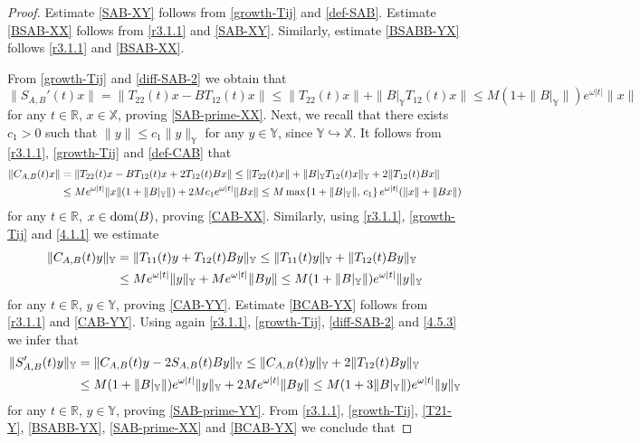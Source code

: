 \documentclass[11pt]{amsart}
\numberwithin{equation}{section}
\newcommand{\SAB}{S_{A,B}}
\newcommand{\CAB}{C_{A,B}}
\theoremstyle{remark}
\theoremstyle{definition}
\newcommand\bX{{\mathbb X}}
\newcommand\bY{{\mathbb Y}}
\newcommand{\dom}{\text{\rm{dom}}}
\begin{document}
\begin{proof}
Estimate \eqref{SAB-XY}	follows from \eqref{growth-Tij} and \eqref{def-SAB}. Estimate \eqref{BSAB-XX} follows from \eqref{r3.1.1} and \eqref{SAB-XY}. Similarly, estimate \eqref{BSABB-YX} follows \eqref{r3.1.1} and \eqref{BSAB-XX}.
	
From \eqref{growth-Tij} and \eqref{diff-SAB-2} we obtain that 
	\begin{equation}\label{4.5.1}
		\|S_{A,B}'(t)x\| = \|T_{22}(t)x - BT_{12}(t)x\| \leq \|T_{22}(t)x\| + \|B|_\bY T_{12}(t)x\|
		\leq M(1+\|B|_\bY\|)e^{\omega|t|}\|x\|
	\end{equation}
for any $t \in \mathbb{R}$, $x \in\bX$, proving \eqref{SAB-prime-XX}. Next, we recall that there exists $c_1 > 0$ such that
$\|y\| \leq c_1 \|y\|_\bY$ for any $y \in \bY$, since $\bY \hookrightarrow\bX$.
It follows from \eqref{r3.1.1}, \eqref{growth-Tij} and \eqref{def-CAB} that
	\begin{align}\label{4.5.2}
		\|\CAB(t)x\|
		&= \|T_{22}(t)x - BT_{12}(t)x + 2T_{12}(t)Bx\| \leq \|T_{22}(t)x\| + \|B|_\bY T_{12}(t)x\|_\bY + 2\|T_{12}(t)Bx\| \notag\\
		&\leq Me^{\omega|t|}\|x\|(1+\|B|_\bY\|) + 2Mc_1 e^{\omega|t|}\|Bx\| \leq M\max\{1+\|B|_\bY\|,\, c_1\}\,e^{\omega|t|}(\|x\|+\|Bx\|) 
	\end{align}
	for any $t \in \mathbb{R}$, $x \in \dom(B)$, proving \eqref{CAB-XX}. Similarly, using \eqref{r3.1.1}, \eqref{growth-Tij} and \eqref{4.1.1} we estimate
	\begin{align}\label{4.5.3}
		\|\CAB(t)y\|_\bY
		&= \|T_{11}(t)y + T_{12}(t)By\|_\bY \leq \|T_{11}(t)y\|_\bY + \|T_{12}(t)By\|_\bY \notag\\
		&\leq Me^{\omega|t|}\|y\|_\bY + Me^{\omega|t|}\|By\|
		\leq M(1+\|B|_\bY\|)e^{\omega|t|}\|y\|_\bY 
	\end{align}
	for any $t \in \mathbb{R}$, $y \in \bY$, proving \eqref{CAB-YY}. Estimate \eqref{BCAB-YX} follows from \eqref{r3.1.1} and \eqref{CAB-YY}. 
	Using again \eqref{r3.1.1}, \eqref{growth-Tij}, \eqref{diff-SAB-2} and \eqref{4.5.3} we infer that
	\begin{align}\label{4.5.4}
		\|S_{A,B}'(t)y\|_\bY&= \|\CAB(t)y - 2\SAB(t)By\|_\bY \leq \|\CAB(t)y\|_\bY + 2\|T_{12}(t)By\|_\bY\notag\\
		&
		\leq M(1+\|B|_\bY\|)e^{\omega|t|}\|y\|_\bY + 2Me^{\omega|t|}\|By\|\leq M(1+3\|B|_\bY\|)e^{\omega|t|}\|y\|_\bY 
	\end{align}
	for any $t \in \mathbb{R}$, $y \in \bY$, proving \eqref{SAB-prime-YY}. 
	From \eqref{r3.1.1}, \eqref{growth-Tij}, \eqref{T21-Y},  \eqref{BSABB-YX}, \eqref{SAB-prime-XX} and \eqref{BCAB-YX} we conclude that

\end{proof}
\end{document}
